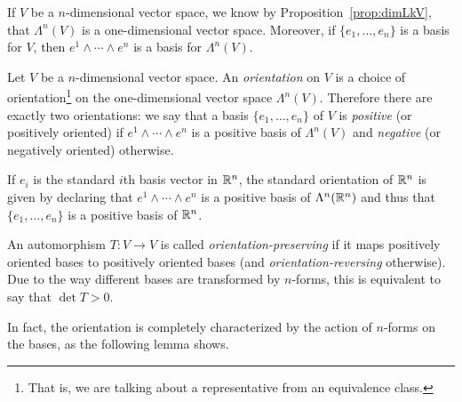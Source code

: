 If $V$ be a $n$-dimensional vector space, we know by Proposition~\ref{prop:dimLkV}, that $\Lambda^n(V)$ is a one-dimensional vector space.
Moreover, if $\{e_1,\ldots,e_n\}$ is a basis for $V$, then $e^1\wedge\cdots\wedge e^n$ is a basis for $\Lambda^n(V)$.

\begin{definition}
	Let $V$ be a $n$-dimensional vector space.
	An \emph{orientation} on $V$ is a choice of orientation\footnote{That is, we are talking about a representative from an equivalence class.} on the one-dimensional vector space $\Lambda^n(V)$.
	Therefore there are exactly two orientations: we say that a basis $\{e_1,\ldots,e_n\}$ of $V$ is \emph{positive} (or positively oriented) if $e^1\wedge\cdots\wedge e^n$ is a positive basis of $\Lambda^n(V)$ and \emph{negative} (or negatively oriented) otherwise.
\end{definition}

\begin{example}
	If $e_i$ is the standard $i$th basis vector in $\mathbb{R}^n$, the standard orientation of $\mathbb{R}^n$ is given by declaring that $e^1\wedge\cdots\wedge e^n$ is a positive basis of $\Lambda^n(\mathbb{R}^n)$ and thus that $\{e_1,\ldots,e_n\}$ is a positive basis of $\mathbb{R}^n$.
\end{example}

An automorphism $T:V\to V$ is called \emph{orientation-preserving} if it maps positively oriented bases to positively oriented bases (and \emph{orientation-reversing} otherwise).
Due to the way different bases are transformed by $n$-forms, this is equivalent to say that $\det T > 0$.


In fact, the orientation is completely characterized by the action of $n$-forms on the bases, as the following lemma shows.

